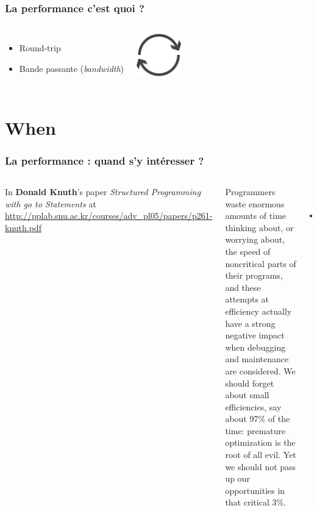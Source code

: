 \documentclass{beamer}
\begin{document}
\begin{frame}
  \frametitle{La performance c'est quoi ?}

  \vfill

\begin{columns}[c]

  \begin{itemize}
  \item Round-trip
  \item Bande passante (\textit{bandwidth})
  \end{itemize}

\begin{center}
  \includegraphics[height=5em]{roundtrip.png}
\end{center}
\end{columns}
\end{frame}

\section{When}

\begin{frame}
  \frametitle{La performance : quand s'y intéresser ?}

  \vfill

\begin{columns}[c]

In \textbf{Donald Knuth}'s paper \textit{Structured Programming with go to
  Statements} at
\url{http://pplab.snu.ac.kr/courses/adv_pl05/papers/p261-knuth.pdf}
\linebreak \vfill

Programmers waste enormous amounts of time thinking about, or worrying
about, the speed of noncritical parts of their programs, and these attempts
at efficiency actually have a strong negative impact when debugging and
maintenance are considered. We should forget about small efficiencies, say
about 97\% of the time: premature optimization is the root of all evil. Yet
we should not pass up our opportunities in that critical 3\%.

\begin{center}
  \includegraphics[height=7em]{knuth.jpg}
\end{center}
\end{columns}
\end{frame}
\end{document}

